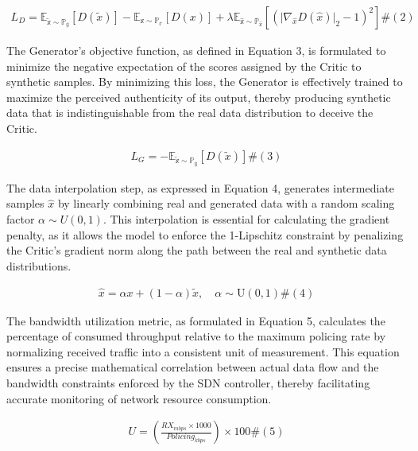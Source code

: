 \[\begin{array}{r}
L_{D} = \mathbb{E}_{\widetilde{\mathbb{x}} \sim \mathbb{P}_{\mathbb{g}}}\left\lbrack D\left( \widetilde{x} \right) \right\rbrack - \mathbb{E}_{\mathbb{x} \sim \mathbb{P}_{\mathbb{r}}}\left\lbrack D(x) \right\rbrack + \lambda\mathbb{E}_{\widehat{\mathbb{x}} \sim \mathbb{P}_{\widehat{\mathbb{x}}}}\left\lbrack \left( \text{|}\nabla_{\widehat{x}}D\left( \widehat{x} \right)\text{|}_{2} - 1 \right)^{2} \right\rbrack\#(2)
\end{array}\]

The Generator's objective function, as defined in Equation 3, is formulated to minimize the negative expectation of the scores assigned by the Critic to synthetic samples. By minimizing this loss, the Generator is effectively trained to maximize the perceived authenticity of its output, thereby producing synthetic data that is indistinguishable from the real data distribution to deceive the Critic.

\[\begin{array}{r}
L_{G} = - \mathbb{E}_{\widetilde{\mathbb{x}} \sim \mathbb{P}_{\mathbb{g}}}\left\lbrack D\left( \widetilde{x} \right) \right\rbrack\#(3)
\end{array}\]

The data interpolation step, as expressed in Equation 4, generates intermediate samples \(\widehat{x}\) by linearly combining real and generated data with a random scaling factor \(\alpha \sim U(0,1)\). This interpolation is essential for calculating the gradient penalty, as it allows the model to enforce the 1-Lipschitz constraint by penalizing the Critic's gradient norm along the path between the real and synthetic data distributions.

\[\begin{array}{r}
\widehat{x} = \alpha x + (1 - \alpha)\widetilde{x},\quad\alpha \sim \text{U}(0,1)\#(4)
\end{array}\]

The bandwidth utilization metric, as formulated in Equation 5, calculates the percentage of consumed throughput relative to the maximum policing rate by normalizing received traffic into a consistent unit of measurement. This equation ensures a precise mathematical correlation between actual data flow and the bandwidth constraints enforced by the SDN controller, thereby facilitating accurate monitoring of network resource consumption.

\[\begin{array}{r}
U = \left( \frac{RX_{mbps} \times 1000}{Policing_{kbps}} \right) \times 100\#(5)
\end{array}\]

